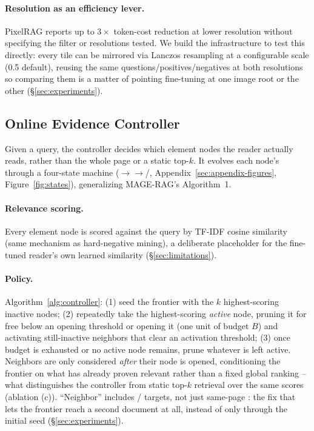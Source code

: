 \paragraph{Resolution as an efficiency lever.} PixelRAG reports up to $3\times$ token-cost reduction at lower resolution without specifying the filter or resolutions tested. We build the infrastructure to test this directly: every tile can be mirrored via Lanczos resampling at a configurable scale (0.5 default), reusing the same questions/positives/negatives at both resolutions so comparing them is a matter of pointing fine-tuning at one image root or the other (\S\ref{sec:experiments}).

\subsection{Online Evidence Controller}
\label{sec:controller}

Given a query, the controller decides which element nodes the reader actually reads, rather than the whole page or a static top-$k$. It evolves each node's  through a four-state machine ($\to$$\to$/, Appendix~\ref{sec:appendix-figures}, Figure~\ref{fig:states}), generalizing MAGE-RAG's Algorithm~1.

\paragraph{Relevance scoring.} Every element node is scored against the query by TF-IDF cosine similarity (same mechanism as hard-negative mining), a deliberate placeholder for the fine-tuned reader's own learned similarity (\S\ref{sec:limitations}).

\paragraph{Policy.} Algorithm~\ref{alg:controller}: (1) seed the frontier with the $k$ highest-scoring inactive nodes; (2) repeatedly take the highest-scoring \emph{active} node, pruning it for free below an opening threshold or opening it (one unit of budget $B$) and activating still-inactive neighbors that clear an activation threshold; (3) once budget is exhausted or no active node remains, prune whatever is left active. Neighbors are only considered \emph{after} their node is opened, conditioning the frontier on what has already proven relevant rather than a fixed global ranking -- what distinguishes the controller from static top-$k$ retrieval over the same scores (ablation (c)). ``Neighbor'' includes / targets, not just same-page : the fix that lets the frontier reach a second document at all, instead of only through the initial seed (\S\ref{sec:experiments}).

